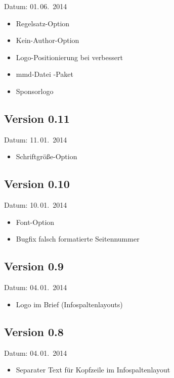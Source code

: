 Datum: 01.\,06.~2014

\begin{itemize}
	\item Regelsatz-Option 
	\item Kein-Author-Option 
	\item Logo-Positionierung bei  verbessert
	\item mmd-Datei -Paket
	\item Sponsorlogo
\end{itemize}

\subsection{Version 0.11}

Datum: 11.\,01.~2014

\begin{itemize}
	\item Schriftgröße-Option 
\end{itemize}

\subsection{Version 0.10}

Datum: 10.\,01.~2014

\begin{itemize}
	\item Font-Option 
	\item Bugfix falsch formatierte Seitennummer
\end{itemize}

\subsection{Version 0.9}

Datum: 04.\,01.~2014

\begin{itemize}
	\item Logo im Brief (Infospaltenlayouts)
\end{itemize}

\subsection{Version 0.8}

Datum: 04.\,01.~2014

\begin{itemize}
	\item Separater Text für Kopfzeile im Infospaltenlayout
\end{itemize}

